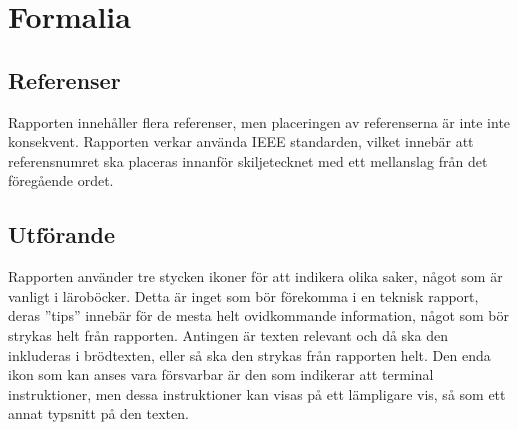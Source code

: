 \section{Formalia} %
\label{sec:formalia}
    \subsection{Referenser} %
    \label{sub:references}
        Rapporten innehåller flera referenser, men placeringen av referenserna är inte inte konsekvent. Rapporten verkar använda IEEE standarden, vilket innebär att referensnumret ska placeras innanför skiljetecknet med ett mellanslag från det föregående ordet.

    \subsection{Utförande} %
    \label{sub:utforande}
        Rapporten använder tre stycken ikoner för att indikera olika saker, något som är vanligt i läroböcker. Detta är inget som bör förekomma i en teknisk rapport, deras ''tips'' innebär för de mesta helt ovidkommande information, något som bör strykas helt från rapporten. Antingen är texten relevant och då ska den inkluderas i brödtexten, eller så ska den strykas från rapporten helt. Den enda ikon som kan anses vara försvarbar är den som indikerar att terminal instruktioner, men dessa instruktioner kan visas på ett lämpligare vis, så som ett annat typsnitt på den texten.
